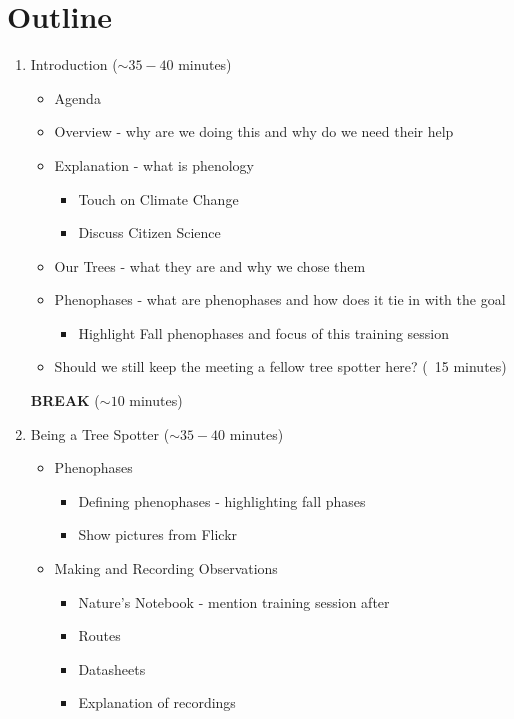 \documentclass{article}\usepackage[]{graphicx}\usepackage[]{color}
\begin{document}
\section*{Outline}
\begin{enumerate}
  \item Introduction ($\sim 35-40$ minutes)
  \begin{itemize}
    \item Agenda
    \item Overview - why are we doing this and why do we need their help
    \item Explanation - what is phenology
    \begin{itemize}
      \item Touch on Climate Change
      \item Discuss Citizen Science
    \end{itemize}
    \item Our Trees - what they are and why we chose them
    \item Phenophases - what are phenophases and how does it tie in with the goal
    \begin{itemize}
      \item Highlight Fall phenophases and focus of this training session
    \end{itemize}
    \item Should we still keep the meeting a fellow tree spotter here? (~15 minutes)
    \end{itemize}
{\textbf{BREAK} ($\sim 10$ minutes)}
  \item Being a Tree Spotter ($\sim 35-40$ minutes)
  \begin{itemize}
    \item Phenophases
    \begin{itemize}
      \item Defining phenophases - highlighting fall phases
      \item Show pictures from Flickr
    \end{itemize}
    \item Making and Recording Observations
    \begin{itemize}
      \item Nature's Notebook - mention training session after
      \item Routes
      \item Datasheets
      \item Explanation of recordings
    \end{itemize}
  \end{itemize}

\end{enumerate}
\end{document}
